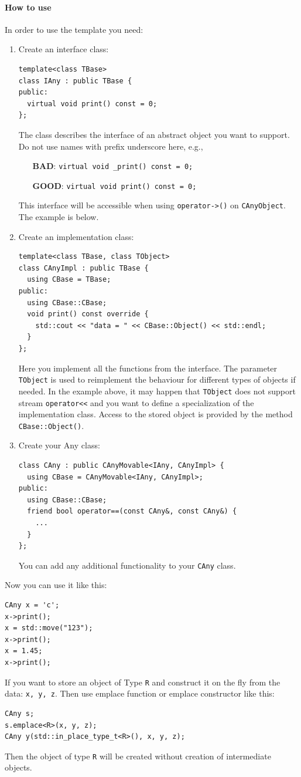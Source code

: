 \documentclass{article}
\begin{document}
\paragraph{How to use}
In order to use the template you need:
\begin{enumerate}
\item Create an interface class:
\begin{verbatim}
template<class TBase>
class IAny : public TBase {
public:
  virtual void print() const = 0;
};
\end{verbatim}
The class describes the interface of an abstract object you want to support. Do not use names with prefix underscore here, e.g.,
\begin{itemize}
\item[\textbf{BAD}:] \verb"virtual void _print() const = 0;"
\item[\textbf{GOOD}:] \verb"virtual void print() const = 0;"
\end{itemize}
This interface will be accessible when using \verb"operator->()" on \verb"CAnyObject". The example is below.

\item Create an implementation class:
\begin{verbatim}
template<class TBase, class TObject>
class CAnyImpl : public TBase {
  using CBase = TBase;
public:
  using CBase::CBase;
  void print() const override {
    std::cout << "data = " << CBase::Object() << std::endl;
  }
};
\end{verbatim}
Here you implement all the functions from the interface. The parameter \verb"TObject" is used to reimplement the behaviour for different types of objects if needed. In the example above, it may happen that \verb"TObject" does not support stream \verb"operator<<" and you want to define  a specialization of the implementation class. Access to the stored object is provided by the method \verb"CBase::Object()".

\item Create your Any class:
\begin{verbatim}
class CAny : public CAnyMovable<IAny, CAnyImpl> {
  using CBase = CAnyMovable<IAny, CAnyImpl>;
public:
  using CBase::CBase;
  friend bool operator==(const CAny&, const CAny&) {
    ...
  }
};
\end{verbatim}
You can add any additional functionality to your \verb"CAny" class.
\end{enumerate}
Now you can use it like this:
\begin{verbatim}
CAny x = 'c';
x->print();
x = std::move("123");
x->print();
x = 1.45;
x->print();
\end{verbatim}
If you want to store an object of Type \verb"R" and construct it on the fly from the data: \verb"x, y, z". Then use emplace function or emplace constructor like this:
\begin{verbatim}
CAny s;
s.emplace<R>(x, y, z);
CAny y(std::in_place_type_t<R>(), x, y, z);
\end{verbatim}
Then the object of type \verb"R" will be created without creation of intermediate objects.
\end{document}
